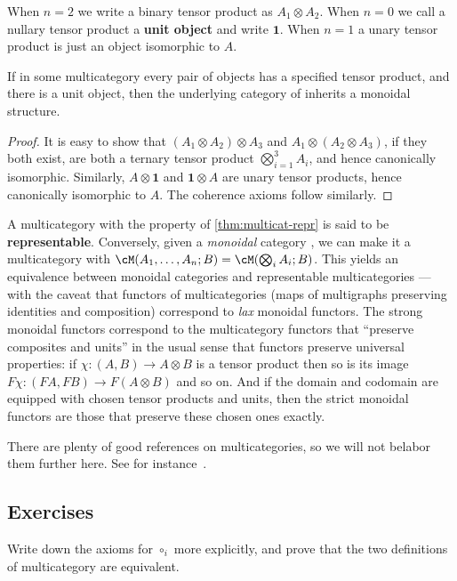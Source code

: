 \documentclass{book}
\def\one{\mathbf{1}}
\let\tensor\otimes
\let\bigtensor\bigotimes
\begin{document}
When $n=2$ we write a binary tensor product as $A_1\tensor A_2$.
When $n=0$ we call a nullary tensor product a \textbf{unit object} and write $\one$.
When $n=1$ a unary tensor product is just an object isomorphic to $A$.

\begin{thm}\label{thm:multicat-repr}
  If in some multicategory \cM every pair of objects has a specified tensor product, and there is a unit object, then the underlying category of \cM inherits a monoidal structure.
\end{thm}
\begin{proof}
  It is easy to show that $(A_1\tensor A_2)\tensor A_3$ and $A_1 \tensor (A_2\tensor A_3)$, if they both exist, are both a ternary tensor product $\bigtensor_{i=1}^3 A_i$, and hence canonically isomorphic.
  Similarly, $A\tensor \one$ and $\one\tensor A$ are unary tensor products, hence canonically isomorphic to $A$.
  The coherence axioms follow similarly.
\end{proof}

A multicategory with the property of \cref{thm:multicat-repr} is said to be \textbf{representable}.
Conversely, given a \emph{monoidal} category \cM, we can make it a multicategory with $\cM(A_1,\dots,A_n;B) = \cM(\bigtensor_i A_i;B)$.
This yields an equivalence between monoidal categories and representable multicategories --- with the caveat that functors of multicategories (maps of multigraphs preserving identities and composition) correspond to \emph{lax} monoidal functors.
The strong monoidal functors correspond to the multicategory functors that ``preserve composites and units'' in the usual sense that functors preserve universal properties: if $\chi:(A,B)\to A\tensor B$ is a tensor product then so is its image $F\chi :(FA,FB)\to F(A\tensor B)$ and so on.
And if the domain and codomain are equipped with chosen tensor products and units, then the strict monoidal functors are those that preserve these chosen ones exactly.

There are plenty of good references on multicategories, so we will not belabor them further here.
See for instance~\cite{hermida:multicats,leinster:higher-opds}.


\subsection*{Exercises}

\begin{ex}\label{ex:multicat-defns}
  Write down the axioms for $\circ_i$ more explicitly, and prove that the two definitions of multicategory are equivalent.
\end{ex}
\end{document}
